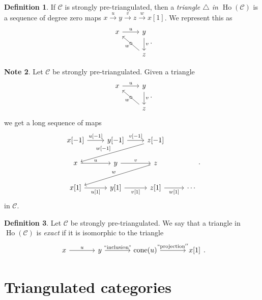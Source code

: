 \documentclass[10pt,letterpaper,cm]{nupset}
\theoremstyle{definition}
\newtheorem{definition}{Definition}[subsection]
\newtheorem{note}[definition]{Note}
\theoremstyle{theorem}
\theoremstyle{remark}
\newcommand{\1}{\mathbf{1}}
\renewcommand{\c}{\mathscr{C}}
\newcommand{\0}{\vec 0}
\DeclareMathOperator{\cone}{cone}
\DeclareMathOperator{\ho}{Ho}
\begin{document}
\begin{definition}
If $\c$ is strongly pre-triangulated, then a \textit{triangle $\triangle$ in $\ho(\c)$} is a sequence of degree zero maps $x\overset{u}{\longrightarrow} y\overset{v}{\longrightarrow}z \overset{w}{\longrightarrow}  x[1]$. We represent this as 
\[
\begin{tikzcd}
x \arrow[r, "u"] & y \arrow[d, "v"]  \\
                 & z \arrow[lu, "\circ" marking, "w"]
\end{tikzcd}
.\]
\end{definition}

\begin{note} Let $\c$ be  strongly pre-triangulated. 
Given a triangle 
\[
\begin{tikzcd}
x \arrow[r, "u"] & y \arrow[d, "v"]  \\
                 & z \arrow[lu, "\circ" marking, "w"]
\end{tikzcd}
.\]
we get a long sequence of maps 
\[
\begin{tikzcd}
{x[{-}1]} \arrow[r, "{u[{-}1]}"] & {y[{-}1]} \arrow[r, "{v[{-}1]}"] & {z[{-}1]} \arrow[lld, "{w[{-}1]}"'] &        \\
x \arrow[r, "u"]                 & y \arrow[r, "v"]                 & z \arrow[lld, "w"']                 &        \\
{x[1]} \arrow[r, "{u[1]}"']      & {y[1]} \arrow[r, "{v[1]}"']      & {z[1]} \arrow[r, "{w[1]}"']         & \cdots
\end{tikzcd}.
\]
in $\c$.
\end{note}

\begin{definition}  Let $\c$ be strongly pre-triangulated.
We say that a triangle in $\ho(\c)$ is \textit{exact} if it is isomorphic to the triangle
\[
\begin{tikzcd}[column sep=large]
x \arrow[r, "u"] & y \arrow[r, "{``\text{inclusion}"}"] & \cone(u) \arrow[r, "``\text{projection}''"] & {x[1]}
\end{tikzcd}
.\]
\end{definition}

\section{Triangulated categories}
\end{document}

